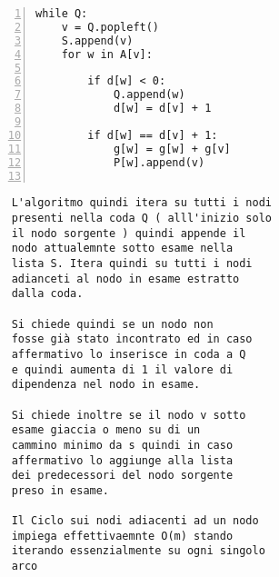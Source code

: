 \begin{minipage}{0.49\linewidth}
	\begin{Verbatim}[frame=topline,numbers=left,label=Codice,framesep=3mm]
 while Q:
	v = Q.popleft()
	S.append(v)
	for w in A[v]:
	
		if d[w] < 0:
			Q.append(w)
			d[w] = d[v] + 1
		
		if d[w] == d[v] + 1:
			g[w] = g[w] + g[v]
			P[w].append(v)
	
	\end{Verbatim}
\end{minipage}\hfill
\begin{minipage}{0.8\linewidth}
	\begin{Verbatim}
	L'algoritmo quindi itera su tutti i nodi 
	presenti nella coda Q ( alll'inizio solo 
	il nodo sorgente ) quindi appende il
	nodo attualemnte sotto esame nella
	lista S. Itera quindi su tutti i nodi
	adianceti al nodo in esame estratto
	dalla coda.
	
	Si chiede quindi se un nodo non 
	fosse già stato incontrato ed in caso
	affermativo lo inserisce in coda a Q
	e quindi aumenta di 1 il valore di 
	dipendenza nel nodo in esame.
	
	Si chiede inoltre se il nodo v sotto
	esame giaccia o meno su di un 
	cammino minimo da s quindi in caso
	affermativo lo aggiunge alla lista
	dei predecessori del nodo sorgente
	preso in esame.
	
	Il Ciclo sui nodi adiacenti ad un nodo
	impiega effettivaemnte O(m) stando
	iterando essenzialmente su ogni singolo 
	arco
	\end{Verbatim}
\end{minipage}